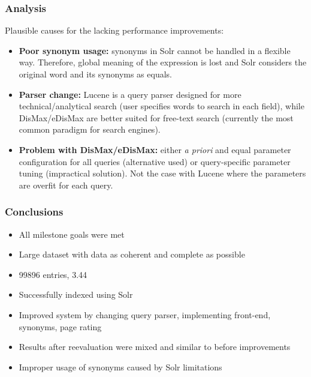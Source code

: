 \documentclass[table]{beamer}
\begin{document}
\begin{frame}
\frametitle{Analysis}

Plausible causes for the lacking performance improvements:
\begin{itemize}
    \item \textbf{Poor synonym usage:} synonyms in Solr
cannot be handled in a flexible way. Therefore, global meaning of the expression is lost and Solr considers the original word and its synonyms as equals.
    \item \textbf{Parser change:} Lucene is a query parser designed for more technical/analytical search (user specifies words to search in each field), while DisMax/eDisMax are better suited for free-text search (currently the most common paradigm for search engines).
    \item \textbf{Problem with DisMax/eDisMax:} either \textit{a priori} and equal parameter configuration for all queries (alternative used) or query-specific parameter tuning (impractical solution). Not the case with Lucene where the parameters are overfit for each query.
\end{itemize}

\end{frame}

\begin{frame}
\frametitle{Conclusions}

\begin{itemize}
    \item All milestone goals were met
    \item Large dataset with data as coherent and complete as possible
    \item \SI{99896}{} entries, \SI{3.44}{\giga\byte}
    \item Successfully indexed using Solr
    \item Improved system by changing query parser, implementing front-end, synonyms, page rating
    \item Results after reevaluation were mixed and similar to before improvements
    \item Improper usage of synonyms caused by Solr limitations
\end{itemize}

\end{frame}
\end{document}
